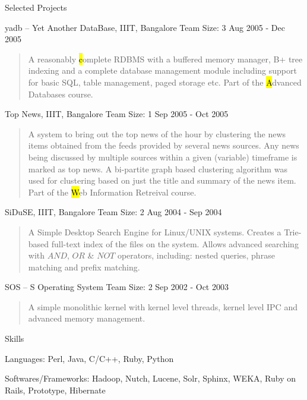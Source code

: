 \documentclass{resume}
\newcommand{\teamsize}{\hfill\sc\footnotesize Team Size: }
\begin{document}
\begin{category}{Selected Projects}{}
    \item {\topic yadb -- Yet Another DataBase,} IIIT, Bangalore
        {\teamsize 3}
        {\period Aug 2005 - Dec 2005}
        \begin{quote}
            A reasonably {\hl complete RDBMS} with a buffered memory manager, B+
            tree indexing and a complete database management module including
            support for basic SQL, table management, paged storage etc. Part of the
            {\hl Advanced Databases} course.
        \end{quote}

    \item {\topic Top News,} IIIT, Bangalore
        {\teamsize 1}
        {\period Sep 2005 - Oct 2005}
        \begin{quote}
            A system to bring out the top news of the hour by clustering the news
            items obtained from the feeds provided by several news sources. Any
            news being discussed by multiple sources within a given (variable)
            timeframe is marked as top news. A bi-partite graph based clustering
            algorithm was used for clustering based on just the title and summary
            of the news item. Part of the {\hl Web Information Retreival} course.
        \end{quote}

    \item {\topic SiDuSE,} IIIT, Bangalore
        {\teamsize 2}
        {\period Aug 2004 - Sep 2004}
        \begin{quote}
            A Simple Desktop Search Engine for Linux/UNIX systems. Creates a
            Trie-based full-text index of the files on the system. Allows advanced
            searching with $AND$, $OR$ \& $NOT$ operators, including: nested
            queries, phrase matching and prefix matching.
        \end{quote}

    \item {\topic SOS -- S Operating System}
        {\teamsize 2}
        {\period Sep 2002 - Oct 2003}
        \begin{quote}
            A simple monolithic kernel with kernel level threads, kernel level IPC and advanced memory management.
        \end{quote}

\end{category}


\begin{category}{Skills}{}

    \item {\topic Languages:} Perl, Java, C/C++, Ruby, Python

    \item {\topic Softwares/Frameworks:} Hadoop, Nutch, Lucene, Solr, Sphinx, WEKA,
    Ruby on Rails, Prototype, Hibernate

\end{category}
\end{document}
